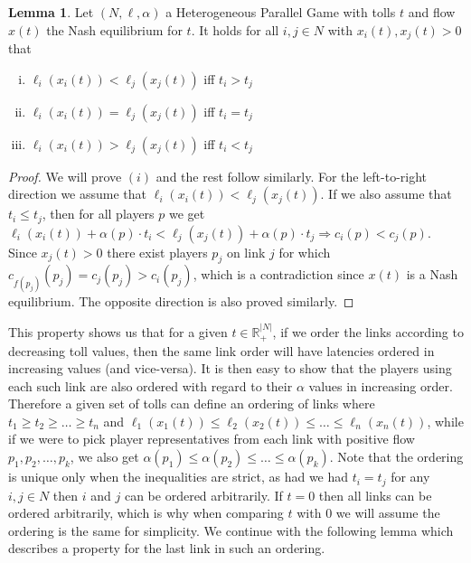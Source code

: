 \documentclass[10pt,a4paper]{book}
\newcommand{\R}{\mathbb{R}}
\theoremstyle{definition}
\newtheorem{lemma}[definition]{Lemma}
\theoremstyle{comment}
\begin{document}
\begin{lemma}
	\label{lemma:latencies_tolls}
	Let $(N, \ell, \alpha)$ a Heterogeneous Parallel Game with tolls $t$ and flow $x(t)$ the Nash equilibrium for $t$.
	It holds for all $i, j \in N$ with $x_i(t), x_j(t) > 0$ that
	\begin{enumerate}[(i)]
		\item $\ell_i(x_i(t)) < \ell_j(x_j(t))$ iff $t_i > t_j$
		\item $\ell_i(x_i(t)) = \ell_j(x_j(t))$ iff $t_i = t_j$
		\item $\ell_i(x_i(t)) > \ell_j(x_j(t))$ iff $t_i < t_j$
	\end{enumerate}
\end{lemma}

\begin{proof}
	We will prove $(i)$ and the rest follow similarly.
	For the left-to-right direction we assume that $\ell_i(x_i(t)) < \ell_j(x_j(t))$.
	If we also assume that $t_i \le t_j$, then for all players $p$ we get $\ell_i(x_i(t)) + \alpha(p) \cdot t_i < \ell_j(x_j(t)) + \alpha(p) \cdot t_j \Rightarrow c_i(p) < c_j(p)$.
	Since $x_j(t) > 0$ there exist players $p_j$ on link $j$ for which $c_{f(p_j)}(p_j) = c_j(p_j) > c_i(p_j)$, which is a contradiction since $x(t)$ is a Nash equilibrium.
	The opposite direction is also proved similarly.
\end{proof}

This property shows us that for a given $t \in \R_+^{|N|}$, if we order the links according to decreasing toll values, then the same link order will have latencies ordered in increasing values (and vice-versa).
It is then easy to show that the players using each such link are also ordered with regard to their $\alpha$ values in increasing order.
Therefore a given set of tolls can define an ordering of links where $t_1 \ge t_2 \ge \dots \ge t_n$ and $\ell_1(x_1(t)) \le \ell_2(x_2(t)) \le \dots \le \ell_n(x_n(t))$, while if we were to pick player representatives from each link with positive flow $p_1, p_2, \dots, p_k$, we also get $\alpha(p_1) \le \alpha(p_2) \le \dots \le \alpha(p_k)$.
Note that the ordering is unique only when the inequalities are strict, as had we had $t_i = t_j$ for any $i, j \in N$ then $i$ and $j$ can be ordered arbitrarily.
If $t = 0$ then all links can be ordered arbitrarily, which is why when comparing $t$ with $0$ we will assume the ordering is the same for simplicity.
We continue with the following lemma which describes a property for the last link in such an ordering.
\end{document}
